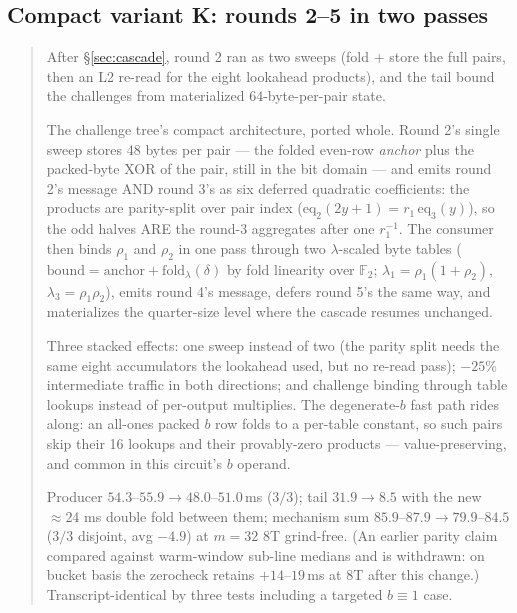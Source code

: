 \documentclass[11pt]{article}
\newenvironment{optsummary}{%
  \begin{quote}\small
  \begin{description}
  \setlength{\itemsep}{1pt}\setlength{\parsep}{0pt}\setlength{\topsep}{2pt}
}{%
  \end{description}
  \end{quote}
}
\begin{document}
\subsection{Compact variant K: rounds 2--5 in two passes}
\label{sec:compactk}

\begin{optsummary}
\item[Baseline:] After \S\ref{sec:cascade}, round 2 ran as two sweeps (fold + store the full pairs, then an L2 re-read for the eight lookahead products), and the tail bound the challenges from materialized $64$-byte-per-pair state.
\item[Improvement:] The challenge tree's compact architecture, ported whole. Round 2's single sweep stores $48$ bytes per pair --- the folded even-row \emph{anchor} plus the packed-byte XOR of the pair, still in the bit domain --- and emits round 2's message AND round 3's as six deferred quadratic coefficients: the products are parity-split over pair index ($\mathrm{eq}_2(2y{+}1) = r_1\,\mathrm{eq}_3(y)$), so the odd halves ARE the round-3 aggregates after one $r_1^{-1}$. The consumer then binds $\rho_1$ and $\rho_2$ in one pass through two $\lambda$-scaled byte tables ($\mathrm{bound} = \mathrm{anchor} + \mathrm{fold}_\lambda(\delta)$ by fold linearity over $\mathbb{F}_2$; $\lambda_1 = \rho_1(1{+}\rho_2)$, $\lambda_3 = \rho_1\rho_2$), emits round 4's message, defers round 5's the same way, and materializes the quarter-size level where the cascade resumes unchanged.
\item[Mechanism:] Three stacked effects: one sweep instead of two (the parity split needs the same eight accumulators the lookahead used, but no re-read pass); $-25\%$ intermediate traffic in both directions; and challenge binding through table lookups instead of per-output multiplies. The degenerate-$b$ fast path rides along: an all-ones packed $b$ row folds to a per-table constant, so such pairs skip their 16 lookups and their provably-zero products --- value-preserving, and common in this circuit's $b$ operand.
\item[Result:] Producer $54.3$--$55.9\to48.0$--$51.0\,$ms ($3/3$); tail $31.9\to8.5$ with the new $\approx24$ ms double fold between them; mechanism sum $85.9$--$87.9\to79.9$--$84.5$ ($3/3$ disjoint, avg $-4.9$) at $m{=}32$ 8T grind-free. (An earlier parity claim compared against warm-window sub-line medians and is withdrawn: on bucket basis the zerocheck retains $+14$--$19\,$ms at 8T after this change.) Transcript-identical by three tests including a targeted $b\equiv1$ case.
\end{optsummary}
\end{document}
